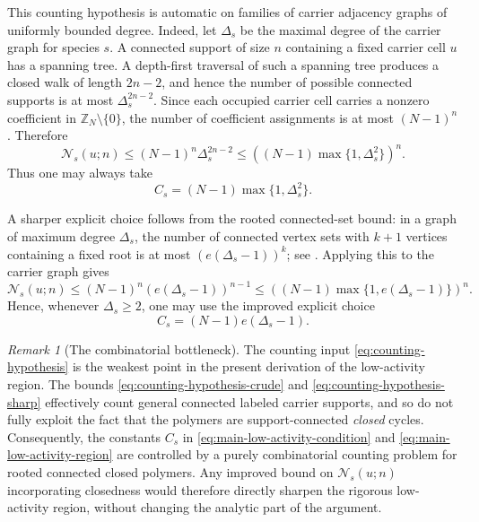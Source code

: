\documentclass[dvipsnames,a4paper]{article}
\numberwithin{equation}{section}
\theoremstyle{definition}
\theoremstyle{remark}
\newtheorem{remark}[theorem]{Remark}
\begin{document}
This counting hypothesis is automatic on families of carrier adjacency graphs of uniformly
bounded degree. Indeed, let \(\Delta_s\) be the maximal degree of the carrier graph for
species \(s\). A connected support of size \(n\) containing a fixed carrier cell \(u\) has a
spanning tree. A depth-first traversal of such a spanning tree produces a closed walk of
length \(2n-2\), and hence the number of possible connected supports is at most
\(\Delta_s^{2n-2}\). Since each occupied carrier cell carries a nonzero coefficient in
\(\mathbb Z_N\setminus\{0\}\), the number of coefficient assignments is at most \((N-1)^n\).
Therefore
\begin{equation}
	\mathcal N_s(u;n)
	\le
	(N-1)^n\Delta_s^{2n-2}
	\le
	\left((N-1)\max\{1,\Delta_s^2\}\right)^n.
	\label{eq:counting-hypothesis-crude}
\end{equation}
Thus one may always take
\begin{equation}
	C_s=(N-1)\max\{1,\Delta_s^2\}.
	\label{eq:Cs-crude}
\end{equation}

A sharper explicit choice follows from the rooted connected-set bound: in a graph of
maximum degree \(\Delta_s\), the number of connected vertex sets with \(k+1\) vertices containing
a fixed root is at most \((e(\Delta_s-1))^k\); see \cite[p.~2]{KangasEtAl2018}. Applying this to
the carrier graph gives
\begin{equation}
	\mathcal N_s(u;n)
	\le
	(N-1)^n \left(e(\Delta_s-1)\right)^{n-1}
	\le
	\left((N-1)\max\{1,e(\Delta_s-1)\}\right)^n.
	\label{eq:counting-hypothesis-sharp}
\end{equation}
Hence, whenever \(\Delta_s\ge 2\), one may use the improved explicit choice
\begin{equation}
	C_s=(N-1)e(\Delta_s-1).
	\label{eq:Cs-sharp}
\end{equation}

\begin{remark}[The combinatorial bottleneck]
	\label{rem:counting-bottleneck}
	The counting input \eqref{eq:counting-hypothesis} is the weakest point in the
	present derivation of the low-activity region. The bounds
	\eqref{eq:counting-hypothesis-crude} and \eqref{eq:counting-hypothesis-sharp}
	effectively count general connected labeled carrier supports, and so do not
	fully exploit the fact that the polymers are support-connected \emph{closed}
	cycles. Consequently, the constants \(C_s\) in
	\eqref{eq:main-low-activity-condition} and
	\eqref{eq:main-low-activity-region} are controlled by a purely combinatorial
	counting problem for rooted connected closed polymers. Any improved bound on
	\(\mathcal N_s(u;n)\) incorporating closedness would therefore directly
	sharpen the rigorous low-activity region, without changing the analytic part
	of the argument.
\end{remark}
\end{document}
